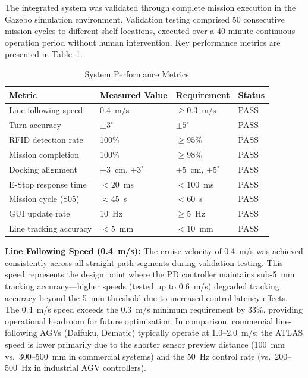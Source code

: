 \documentclass[12pt,a4paper,oneside]{report}
\begin{document}
The integrated system was validated through complete mission execution in the Gazebo simulation environment. Validation testing comprised 50 consecutive mission cycles to different shelf locations, executed over a 40-minute continuous operation period without human intervention. Key performance metrics are presented in Table~\ref{tab:performance}.

\begin{table}[H]
\centering
\caption{System Performance Metrics}
\label{tab:performance}
\begin{tabular}{p{4.5cm} p{3cm} p{2.5cm} p{2cm}}
\toprule
\textbf{Metric} & \textbf{Measured Value} & \textbf{Requirement} & \textbf{Status} \\
\midrule
Line following speed & 0.4~m/s & $\geq 0.3$~m/s & PASS \\
Turn accuracy & $\pm 3^{\circ}$ & $\pm 5^{\circ}$ & PASS \\
RFID detection rate & 100\% & $\geq 95\%$ & PASS \\
Mission completion & 100\% & $\geq 98\%$ & PASS \\
Docking alignment & $\pm 3$~cm, $\pm 3^{\circ}$ & $\pm 5$~cm, $\pm 5^{\circ}$ & PASS \\
E-Stop response time & $< 20$~ms & $< 100$~ms & PASS \\
Mission cycle (S05) & $\approx 45$~s & $< 60$~s & PASS \\
GUI update rate & 10~Hz & $\geq 5$~Hz & PASS \\
Line tracking accuracy & $< 5$~mm & $< 10$~mm & PASS \\
\bottomrule
\end{tabular}
\end{table}

\textbf{Line Following Speed (0.4~m/s):} The cruise velocity of 0.4~m/s was achieved consistently across all straight-path segments during validation testing. This speed represents the design point where the PD controller maintains sub-5~mm tracking accuracy---higher speeds (tested up to 0.6~m/s) degraded tracking accuracy beyond the 5~mm threshold due to increased control latency effects. The 0.4~m/s speed exceeds the 0.3~m/s minimum requirement by 33\%, providing operational headroom for future optimisation. In comparison, commercial line-following AGVs (Daifuku, Dematic) typically operate at 1.0--2.0~m/s; the ATLAS speed is lower primarily due to the shorter sensor preview distance (100~mm vs.\ 300--500~mm in commercial systems) and the 50~Hz control rate (vs.\ 200--500~Hz in industrial AGV controllers).
\end{document}
